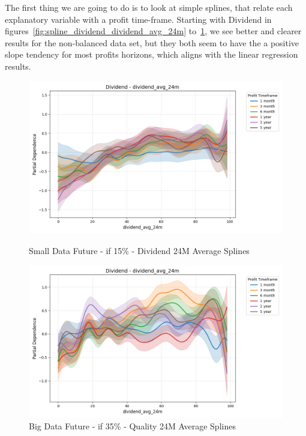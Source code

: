 \documentclass[11pt,english,a4paper,hidelinks]{book}
\begin{document}
\noindent The first thing we are going to do is to look at simple splines, that relate each explanatory variable with a profit time-frame. Starting with Dividend in figures~\ref{fig:spline_dividend_dividend_avg_24m} to~\ref{fig:spline_dividend_dividend_avg_24m_balanced}, we see better and clearer results for the non-balanced data set, but they both seem to have the a positive slope tendency for most profits horizons, which aligns with the linear regression results. 

\begin{figure}[H]
    \centering
    \begin{minipage}{0.48\textwidth}
        \centering
        \includegraphics[width=\textwidth]{images/code/models/general_regression/splines/2D/Small Data future - IF/dividend_dividend_avg_24m.png}
        \caption{Small Data Future - \acrshort{if} 15\% - Dividend 24M Average Splines}
        \label{fig:spline_dividend_dividend_avg_24m}
    \end{minipage}\hfill
    \begin{minipage}{0.48\textwidth}
        \centering
        \includegraphics[width=\textwidth]{images/code/models/general_regression/splines/2D/Big Data future - IF HARD Balanced/dividend_dividend_avg_24m.png}
        \caption{Big Data Future - \acrshort{if} 35\% - Quality 24M Average Splines}
        \label{fig:spline_dividend_dividend_avg_24m_balanced}
    \end{minipage}
\end{figure}
\end{document}
